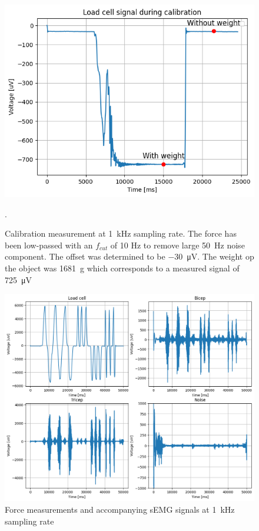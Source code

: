 \begin{figure}[h!t]
	\begin{center}
		\includegraphics[width=0.8\columnwidth]{images/measurement_calibratie3_1k.png}
	\end{center}
	\caption{Calibration measurement at \SI{1}{\kilo\hertz} sampling rate. The force has been low-passed with an $f_{cut}$ of 10 Hz to remove large \SI{50}{\hertz} noise component. The offset was determined to be \SI{-30}{\micro\volt}. The weight op the object was \SI{1681}{\gram} which corresponds to a measured signal of \SI{725}{\micro\volt}}.
	\label{fig:calibration_1k}
\end{figure}

\begin{figure}[h!t]
	\begin{center}
		\includegraphics[width=1.0\columnwidth]{images/measurement_meting3_1k.png}
	\end{center}
	\caption{Force measurements and accompanying sEMG signals at \SI{1}{\kilo\hertz} sampling rate}
	\label{fig:measurement_1k}
\end{figure}

